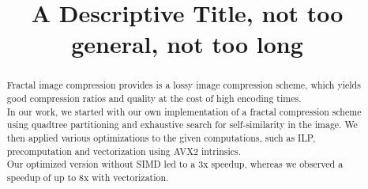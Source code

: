 \documentclass[letterpaper]{article}
\title{A Descriptive Title, not too general, not too long}
\begin{document}
%
\maketitle
%

\begin{abstract}
    Fractal image compression provides is a lossy image compression scheme,
    which yields good compression ratios and quality at the cost of high encoding times.\\
    In our work, we started with our own implementation of a fractal compression scheme using quadtree partitioning
    and exhaustive search for self-similarity in the image. 
    We then applied various optimizations to the given computations, such as ILP, precomputation and vectorization using AVX2 intrinsics.\\
    Our optimized version without SIMD led to a 3x speedup, whereas we observed a speedup of up to 8x with vectorization.
\end{abstract}













\end{document}
